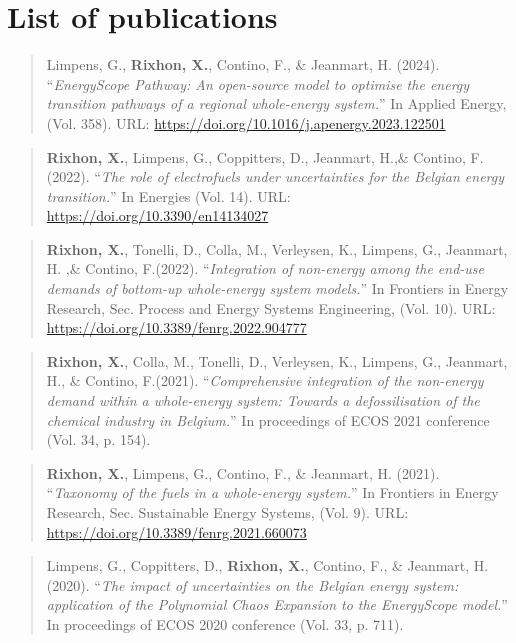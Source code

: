 

\chapter*{List of publications}
\vskip0.5cm


\begin{quote}
Limpens, G., \textbf{Rixhon, X.}, Contino, F., \& Jeanmart, H. (2024). ``\emph{EnergyScope Pathway: An open-source model to optimise the energy transition pathways of a regional whole-energy system.}'' In Applied Energy, (Vol. 358). URL: \url{https://doi.org/10.1016/j.apenergy.2023.122501}
\end{quote}

\begin{quote}
\textbf{Rixhon, X.}, Limpens, G., Coppitters, D., Jeanmart, H.,\& Contino, F.(2022). ``\emph{The role of electrofuels under uncertainties for the Belgian energy transition.}'' In Energies (Vol. 14). URL: \url{https://doi.org/10.3390/en14134027}
\end{quote}

\begin{quote}
\textbf{Rixhon, X.}, Tonelli, D., Colla, M., Verleysen, K., Limpens, G., Jeanmart, H. ,\& Contino, F.(2022). ``\emph{Integration of non-energy among the end-use demands of bottom-up whole-energy system models.}'' In Frontiers in Energy Research, Sec. Process and Energy Systems Engineering, (Vol. 10). URL: \url{https://doi.org/10.3389/fenrg.2022.904777}
\end{quote}

\begin{quote}
\textbf{Rixhon, X.}, Colla, M., Tonelli, D., Verleysen, K.,  Limpens, G., Jeanmart, H., \& Contino, F.(2021). ``\emph{Comprehensive integration of the non-energy demand within a whole-energy system: Towards a defossilisation of the chemical industry in Belgium.}'' In proceedings of  ECOS 2021 conference (Vol. 34, p. 154).
\end{quote}

\begin{quote}
\textbf{Rixhon, X.}, Limpens, G., Contino, F., \& Jeanmart, H. (2021). ``\emph{Taxonomy of the fuels in a whole-energy system.}'' In Frontiers in Energy Research, Sec. Sustainable Energy Systems, (Vol. 9). URL: \url{https://doi.org/10.3389/fenrg.2021.660073} 
\end{quote}

\begin{quote}
Limpens, G., Coppitters, D., \textbf{Rixhon, X.}, Contino, F., \& Jeanmart, H. (2020). ``\emph{The impact of uncertainties on the Belgian energy system: application of the Polynomial Chaos Expansion to the EnergyScope model.}'' In proceedings of  ECOS 2020 conference (Vol. 33, p. 711).
\end{quote}